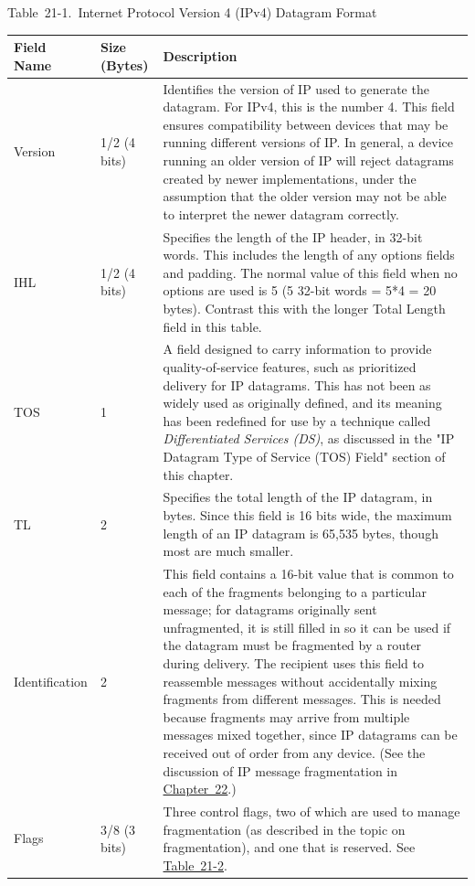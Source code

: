 \documentclass[b5paper,11pt]{memoir}
\begin{document}
\protect\hypertarget{ch21s02.htmlux5cux23internet_protocol_version__ipv_datagram}{}{}

Table~21-1.~Internet Protocol Version 4 (IPv4) Datagram Format

\begin{longtable}[]{@{}lll@{}}
\toprule
Field Name & Size (Bytes) & Description\tabularnewline
\midrule
\endhead
Version & 1/2 (4 bits) & Identifies the version of IP used to generate
the datagram. For IPv4, this is the number 4. This field ensures
compatibility between devices that may be running different versions of
IP. In general, a device running an older version of IP will reject
datagrams created by newer implementations, under the assumption that
the older version may not be able to interpret the newer datagram
correctly.\tabularnewline
IHL & 1/2 (4 bits) & Specifies the length of the IP header, in 32-bit
words. This includes the length of any options fields and padding. The
normal value of this field when no options are used is 5 (5 32-bit words
= 5*4 = 20 bytes). Contrast this with the longer Total Length field in
this table.\tabularnewline
TOS & 1 & A field designed to carry information to provide
quality-of-service features, such as prioritized delivery for IP
datagrams. This has not been as widely used as originally defined, and
its meaning has been redefined for use by a technique called
{\emph{Differentiated Services (DS)}}, as discussed in the "IP Datagram
Type of Service (TOS) Field" section of this chapter.\tabularnewline
TL & 2 & Specifies the total length of the IP datagram, in bytes. Since
this field is 16 bits wide, the maximum length of an IP datagram is
65,535 bytes, though most are much smaller.\tabularnewline
Identification & 2 & This field contains a 16-bit value that is common
to each of the fragments belonging to a particular message; for
datagrams originally sent unfragmented, it is still filled in so it can
be used if the datagram must be fragmented by a router during delivery.
The recipient uses this field to reassemble messages without
accidentally mixing fragments from different messages. This is needed
because fragments may arrive from multiple messages mixed together,
since IP datagrams can be received out of order from any device. (See
the discussion of IP message fragmentation in
\protect\hyperlink{ch22.html}{Chapter~22}.)\tabularnewline
Flags & 3/8 (3 bits) & Three control flags, two of which are used to
manage fragmentation (as described in the topic on fragmentation), and
one that is reserved. See
\protect\hyperlink{ch21s02.htmlux5cux23ipv_flags_subfields}{Table~21-2}.\tabularnewline

\end{longtable}
\end{document}
